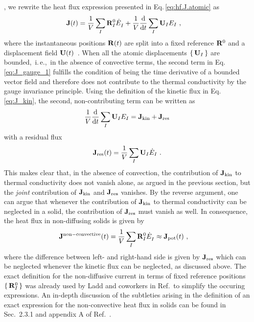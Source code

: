 , we rewrite the heat flux expression presented in Eq.\,\eqref{eq:hf.J.atomic} as
\begin{align}
	\b J (t) 
	&= \frac{1}{V} \sum_I \b R_I^0 \fD{\dot{E}}_I + { \frac{1}{V} \frac{\d}{\d t} \sum_I \b U_I E_I}~,
	\label{eq:J_gauge_1}
\end{align}
where the instantaneous positions ${\bf R} (t)$ are split into a fixed reference ${\bf R}^0$ and a displacement field ${\bf U} (t)$~\cite{Isaeva2019}. When all the atomic displacements $\set{{\bf U}_I}$ are bounded,~i.\,e.,~in the absence of convective terms, the second term in Eq.\,\eqref{eq:J_gauge_1} fulfills the condition of being the time derivative of a bounded vector field and therefore does not contribute to the thermal conductivity by the gauge invariance principle. Using the definition of the kinetic flux in Eq.\,\eqref{eq:J_kin}, the second, non-contributing term can be written as
\begin{align}
	\frac{1}{V} \frac{\d}{\d t} \sum_I \b U_I E_I
		= {\bf J}_{\rm kin} + {\bf J}_{\rm res}
	\label{eq:J_gauge_2}
\end{align}
with a residual flux %
\begin{align}
	{\bf J}_{\rm res} (t)
		= \frac{1}{V} \sum_I \b U_I \dot E_I~.
	\label{eq:J_gauge_3}
\end{align}
This makes clear that, in the absence of convection, the contribution of ${\bf J}_{\rm kin}$ to thermal conductivity does not vanish alone, as argued in the previous section, but the \emph{joint} contribution of ${\bf J}_{\rm kin}$ and ${\bf J}_{\rm res}$ vanishes. By the reverse argument, one can argue that whenever the contribution of ${\bf J}_{\rm kin}$ to thermal conductivity can be neglected in a solid, the contribution of ${\bf J}_{\rm res}$ must vanish as well. In consequence, the heat flux in non-diffusing solids is given by
\begin{align}
	\b J^{\rm non-convective} (t) 
		&= \frac{1}{V} \sum_I \b R_I^0 \fD{\dot{E}}_I
		\approx {\bf J}_{\rm pot} (t)~,
	\label{eq:J_tot_solid}
\end{align}
where the difference between left- and right-hand side is given by ${\bf J}_{\rm res}$ which can be neglected whenever the kinetic flux can be neglected, as discussed above. The exact definition for the non-diffusive current in terms of fixed reference positions $\set{{\bf R}^0_I}$ was already used by Ladd and coworkers in Ref.\,\cite{Ladd1986} to simplify the occuring expressions. An in-depth discussion of the subtleties arising in the definition of an exact expression for the non-convective heat flux in solids can be found in Sec.~2.3.1 and appendix A of Ref.~\cite{ErcoleThesis}.


